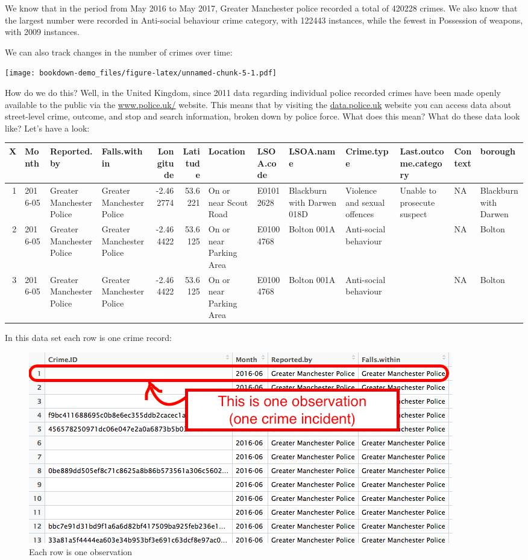 \documentclass[
]{book}
\begin{document}
We know that in the period from May 2016 to May 2017, Greater Manchester police recorded a total of 420228 crimes. We also know that the largest number were recorded in Anti-social behaviour crime category, with 122443 instances, while the fewest in Possession of weapons, with 2009 instances.

We can also track changes in the number of crimes over time:

\texttt{[image: bookdown-demo\_files/figure-latex/unnamed-chunk-5-1.pdf]}

How do we do this? Well, in the United Kingdom, since 2011 data regarding individual police recorded crimes have been made openly available to the public via the \href{https://www.police.uk/}{www.police.uk/} website. This means that by visiting the \href{https://data.police.uk/}{data.police.uk} website you can access data about street-level crime, outcome, and stop and search information, broken down by police force. What does this mean? What do these data look like? Let's have a look:

\begin{tabular}{r|l|l|l|r|r|l|l|l|l|l|l|l}
\hline
X & Month & Reported.by & Falls.within & Longitude & Latitude & Location & LSOA.code & LSOA.name & Crime.type & Last.outcome.category & Context & borough\\
\hline
1 & 2016-05 & Greater Manchester Police & Greater Manchester Police & -2.462774 & 53.6221 & On or near Scout Road & E01012628 & Blackburn with Darwen 018D & Violence and sexual offences & Unable to prosecute suspect & NA & Blackburn with Darwen\\
\hline
2 & 2016-05 & Greater Manchester Police & Greater Manchester Police & -2.464422 & 53.6125 & On or near Parking Area & E01004768 & Bolton 001A & Anti-social behaviour &  & NA & Bolton\\
\hline
3 & 2016-05 & Greater Manchester Police & Greater Manchester Police & -2.464422 & 53.6125 & On or near Parking Area & E01004768 & Bolton 001A & Anti-social behaviour &  & NA & Bolton\\
\hline
\end{tabular}

In this data set each row is one crime record:

\begin{figure}
\centering
\includegraphics{imgs/rowIsObservation.png}
\caption{Each row is one observation}
\end{figure}
\end{document}
